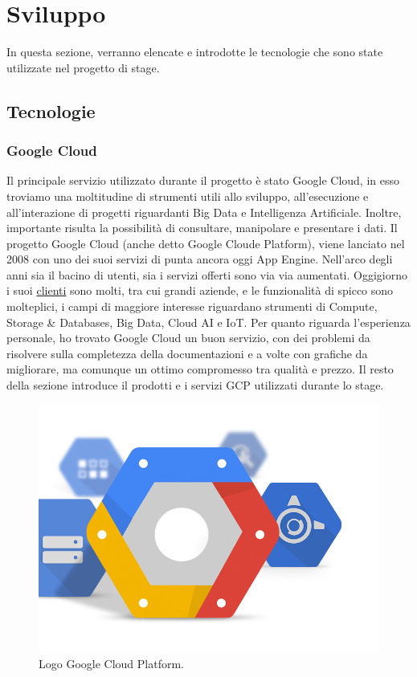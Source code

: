 \chapter{Sviluppo}
In questa sezione, verranno elencate e introdotte le tecnologie che sono state utilizzate nel progetto di stage.
\section{Tecnologie}
\subsection{Google Cloud}
Il principale servizio utilizzato durante il progetto è stato Google Cloud, in esso troviamo una moltitudine di strumenti utili allo sviluppo, all'esecuzione e all'interazione di progetti riguardanti Big Data e Intelligenza Artificiale. Inoltre, importante risulta la possibilità di consultare, manipolare e presentare i dati.
Il progetto Google Cloud (anche detto Google Cloude Platform), viene lanciato nel 2008 con uno dei suoi servizi di punta ancora oggi  \gls{App Engine}. Nell'arco degli anni sia il bacino di utenti, sia i servizi offerti sono via via aumentati. Oggigiorno i suoi \href{https://cloud.google.com/customers/#/}{clienti} sono molti, tra cui grandi aziende, e le funzionalità di spicco sono molteplici, i campi di maggiore interesse riguardano strumenti di Compute, Storage \& Databases, Big Data, Cloud AI e IoT.
Per quanto riguarda l'esperienza personale, ho trovato Google Cloud un buon servizio, con dei problemi da risolvere sulla completezza della documentazioni e a volte con grafiche da migliorare, ma comunque un ottimo compromesso tra qualità e prezzo.
Il resto della sezione introduce il prodotti e i servizi GCP utilizzati durante lo stage.
\begin{figure}
	\centering
	\includegraphics[scale=0.3]{figures/google-cloud-platform}
	\caption[Logo Google Cloud Platform.]{Logo Google Cloud Platform.
		\label{fig:logoGCP}}
\end{figure}	
